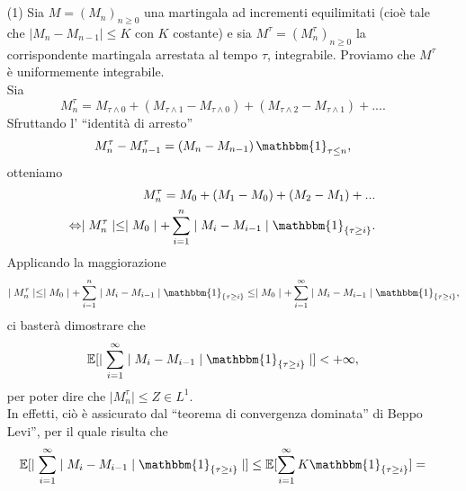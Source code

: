 \documentclass[11pt,largemargins]{homework}
\begin{document}
  \section{}%
  \begin{enumerate}
  \item[(1)]
  Sia $M=\left(M_{n}\right)_{n\geq 0}$ una martingala ad incrementi equilimitati (cioè tale che $\mid M_{n}-M_{n-1}\mid\leq K$ con $K$ costante) e sia $M^{\tau}=\left(M_{n}^{\tau}\right)_{n\geq 0}$ la corrispondente martingala arrestata al tempo $\tau $, integrabile. Proviamo che $M^{\tau}$ è uniformemente integrabile.\\
  Sia
  \begin{equation*}
  M_{n}^{\tau}=M_{\tau\wedge 0}+\left(M_{\tau\wedge 1}-M_{\tau\wedge 0}\right)+\left(M_{\tau\wedge 2}-M_{\tau\wedge 1}\right)+....
  \end{equation*}
  Sfruttando l' ``identità di arresto''
  \begin{equation*}
  M_{n}^{\tau}-M_{n-1}^{\tau}=\left(M_{n}-M_{n-1}\right)\mathbbm{1}_{\tau\leq n},
  \end{equation*}
  otteniamo
  \begin{align*}
   M_{n}^{\tau}=M_{0}+\left(M_{1}-M_{0}\right)+\left(M_{2}-M_{1}\right)+...\\
   \Leftrightarrow\mid M_{n}^{\tau}\mid \leq \mid M_{0}\mid + \sum_{i=1}^{n}\mid M_{i}-M_{i-1}\mid \mathbbm{1}_{\{\tau\geq i\}}.
  \end{align*}
  Applicando la maggiorazione
  \begin{equation*}
\mid M_{n}^{\tau}\mid \leq \mid M_{0}\mid + \sum_{i=1}^{n}\mid M_{i}-M_{i-1}\mid \mathbbm{1}_{\{\tau\geq i\}}\leq \mid M_{0}\mid + \sum_{i=1}^{\infty}\mid M_{i}-M_{i-1}\mid \mathbbm{1}_{\{\tau\geq i\}},
     \end{equation*}
     ci basterà dimostrare che
     \begin{equation*}
     \mathbb{E}[\mid \sum_{i=1}^{\infty}\mid M_{i}-M_{i-1}\mid \mathbbm{1}_{\{\tau\geq i\}} \mid]<+\infty,
     \end{equation*}
     per poter dire che  $\mid M_{n}^{\tau}\mid\leq Z \in L^{1}$.\\
     In effetti, ciò è assicurato dal ``teorema di convergenza dominata'' di Beppo Levi'', per il quale risulta che
     \begin{align*}
      &\mathbb{E}[\mid \sum_{i=1}^{\infty}\mid M_{i}-M_{i-1}\mid \mathbbm{1}_{\{\tau\geq i\}} \mid]\leq  \mathbb{E}[\sum_{i=1}^{\infty}K \mathbbm{1}_{\{\tau\geq i\}} ]=\\

\end{align*}
\end{enumerate}
\end{document}
